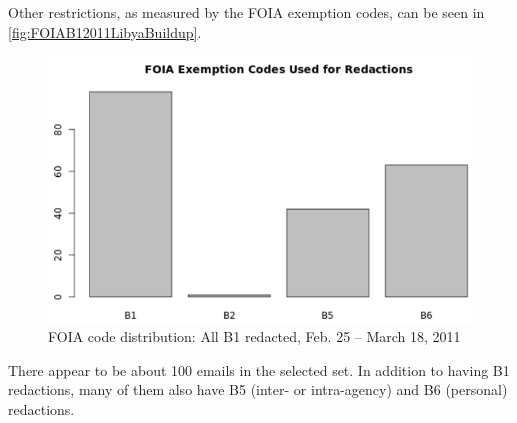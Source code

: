 \documentclass[journal]{vgtc}                %
\begin{document}
Other restrictions, as measured by the FOIA exemption codes, can be seen in \autoref{fig:FOIAB12011LibyaBuildup}.
\begin{figure}[h]
\begin{center}
\includegraphics[width=0.95\linewidth]{FOIAB12011LibyaBuildup}
\caption{FOIA code distribution: All  B1 redacted, Feb. 25 -- March 18, 2011}
\label{fig:FOIAB12011LibyaBuildup}
\end{center}
\end{figure}
There appear to be about 100 emails in the selected set.  In addition to having B1 redactions, many of them also have B5 (inter- or intra-agency) and B6 (personal) redactions.
\end{document}
